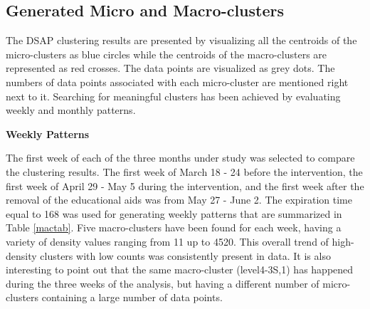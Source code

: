 \subsection{Generated Micro and Macro-clusters}

The DSAP clustering results are presented by visualizing all the centroids of the micro-clusters as blue circles while the centroids of the macro-clusters are represented as red crosses. The data points are visualized as grey dots. The numbers of data points associated with each micro-cluster are mentioned right next to it. Searching for meaningful clusters has been achieved by evaluating weekly and monthly patterns.

\vspace{7mm}
\hspace{-1 cm}
\textbf{Weekly Patterns}

The first week of each of the three months under study was selected to compare the clustering results. The first week of March 18 - 24 before the intervention, the first week of April 29 - May 5 during the intervention, and the first week after the removal of the educational aids was from May 27 - June 2. The expiration time equal to 168 was used for generating weekly patterns that are summarized in Table \ref{mactab}. Five macro-clusters have been found for each week, having a variety of density values ranging from 11 up to 4520. This overall trend of high-density clusters with low counts was consistently present in data. It is also interesting to point out that the same macro-cluster (level4-3S,1) has happened during the three weeks of the analysis, but having a different number of micro-clusters containing a large number of data points. 

